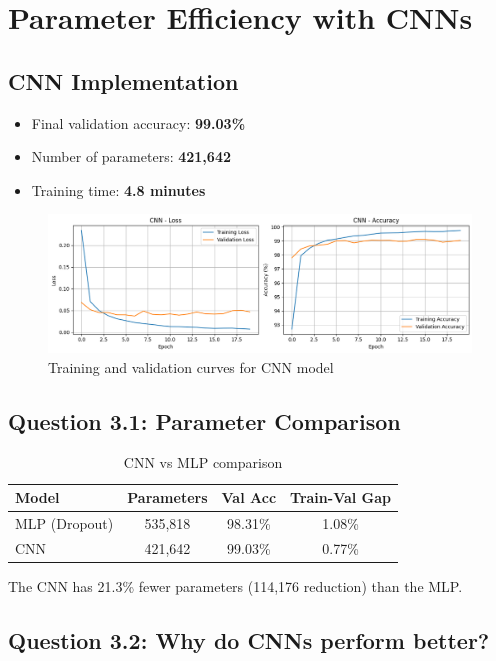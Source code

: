 \section{Parameter Efficiency with CNNs}

\subsection{CNN Implementation}

\begin{itemize}
    \item Final validation accuracy: \textbf{99.03\%}
    \item Number of parameters: \textbf{421,642}
    \item Training time: \textbf{4.8 minutes}
\end{itemize}

\begin{figure}[h]
    \centering
    \includegraphics[width=0.7\linewidth]{section3/cnn.png}
    \caption{Training and validation curves for CNN model}
    \label{fig:cnn}
\end{figure}

\subsection{Question 3.1: Parameter Comparison}

\begin{table}[h]
\centering
\begin{tabular}{|l|c|c|c|}
\hline
\textbf{Model} & \textbf{Parameters} & \textbf{Val Acc} & \textbf{Train-Val Gap} \\ \hline
MLP (Dropout) & 535,818 & 98.31\% & 1.08\% \\ \hline
CNN & 421,642 & 99.03\% & 0.77\% \\ \hline
\end{tabular}
\caption{CNN vs MLP comparison}
\label{tab:cnn-comparison}
\end{table}

The CNN has 21.3\% fewer parameters (114,176 reduction) than the MLP.

\subsection{Question 3.2: Why do CNNs perform better?}

